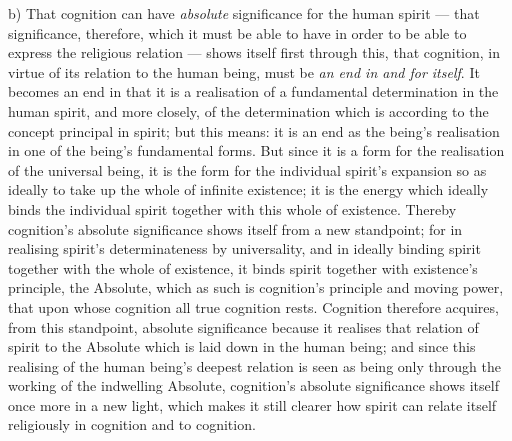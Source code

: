 \documentclass[12pt,a4paper]{book}
\begin{document}
b) That cognition can have \emph{absolute} significance for the human spirit
--- that significance, therefore, which it must be able to have in order to be
able to express the religious relation --- shows itself first through this,
that cognition, in virtue of its relation to the human being, must be \emph{an
end in and for itself}. It becomes an end in that it is a realisation of a
fundamental determination in the human spirit, and more closely, of the
determination which is according to
the concept principal in spirit; but this means: it is an end as the being's
realisation in one of the being's fundamental forms. But since it is a form
for the realisation of the universal being, it is the form for the individual
spirit's expansion so as ideally to take up the whole of infinite existence;
it is the energy which ideally binds the individual spirit together with this
whole of existence. Thereby cognition's absolute significance shows itself
from a new standpoint; for in realising spirit's determinateness by
universality, and in ideally binding spirit together with the whole of
existence, it binds spirit together with existence's principle, the Absolute,
which as such is cognition's principle and moving power, that upon whose
cognition all true cognition rests. Cognition therefore acquires, from this
standpoint, absolute significance because it realises that relation of spirit
to the Absolute which is laid down in the human being; and since this
realising of the human being's deepest relation is seen as being only through
the working of the indwelling Absolute, cognition's absolute significance
shows itself once more in a new light, which makes it still clearer how spirit
can relate itself religiously in cognition and to cognition.
\end{document}
